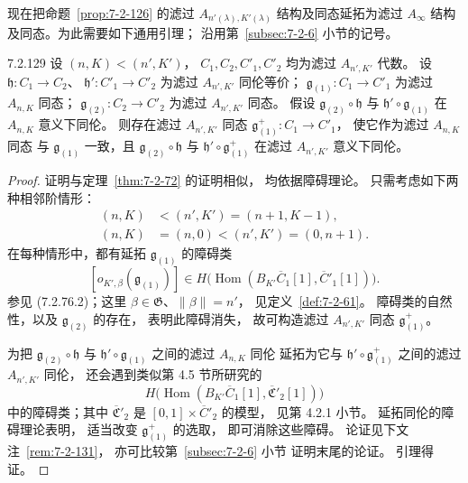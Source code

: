 现在把命题~\ref{prop:7-2-126}
的滤过 $A_{n'(\lambda),K'(\lambda)}$
结构及同态延拓为滤过 $A_\infty$
结构及同态。为此需要如下通用引理；
沿用第~\ref{subsec:7-2-6} 小节的记号。
%
\begin{lemma}{7.2.129}\label{lem:7-2-129}
设 $(n,K)<(n',K')$，
$C_1,C_2,C'_1,C'_2$
均为滤过 $A_{n',K'}$ 代数。
设
$\mathfrak h\colon C_1\to C_2$、
$\mathfrak h'\colon C'_1\to C'_2$
为滤过 $A_{n',K'}$ 同伦等价；
$\mathfrak g_{(1)}\colon C_1\to C'_1$
为滤过 $A_{n,K}$ 同态；
$\mathfrak g_{(2)}\colon C_2\to C'_2$
为滤过 $A_{n',K'}$ 同态。
假设 $\mathfrak g_{(2)}\circ\mathfrak h$
与 $\mathfrak h'\circ\mathfrak g_{(1)}$
在 $A_{n,K}$ 意义下同伦。
则存在滤过 $A_{n',K'}$ 同态
$\mathfrak g^+_{(1)}\colon C_1\to C'_1$，
使它作为滤过 $A_{n,K}$ 同态
与 $\mathfrak g_{(1)}$ 一致，且
$\mathfrak g_{(2)}\circ\mathfrak h$
与 $\mathfrak h'\circ\mathfrak g^+_{(1)}$
在滤过 $A_{n',K'}$ 意义下同伦。
\end{lemma}
\begin{proof}
证明与定理~\ref{thm:7-2-72} 的证明相似，
均依据障碍理论。
只需考虑如下两种相邻阶情形：
\begin{align}
(n,K)&<(n',K')=(n+1,K-1),
\tag{7.2.130.1}\label{eq:7-2-130-1}\\
(n,K)&=(n,0)<(n',K')=(0,n+1).
\tag{7.2.130.2}\label{eq:7-2-130-2}
\end{align}
在每种情形中，都有延拓
$\mathfrak g_{(1)}$ 的障碍类
\[
[o_{K',\beta}(\mathfrak g_{(1)})]
\in H\bigl(\operatorname{Hom}
(B_{K'}\overline C_1[1],\overline C'_1[1])\bigr).
\]
参见 (7.2.76.2)；这里
$\beta\in\mathfrak G$、$\|\beta\|=n'$，
见定义~\ref{def:7-2-61}。
障碍类的自然性，以及
$\mathfrak g_{(2)}$ 的存在，
表明此障碍消失，
故可构造滤过 $A_{n',K'}$ 同态
$\mathfrak g^+_{(1)}$。

为把
$\mathfrak g_{(2)}\circ\mathfrak h$
与 $\mathfrak h'\circ\mathfrak g_{(1)}$
之间的滤过 $A_{n,K}$ 同伦
延拓为它与
$\mathfrak h'\circ\mathfrak g^+_{(1)}$
之间的滤过 $A_{n',K'}$ 同伦，
还会遇到类似第 4.5 节所研究的
\[
H\bigl(\operatorname{Hom}
(B_{K'}\overline C_1[1],\overline{\mathfrak C}'_2[1])\bigr)
\]
中的障碍类；其中
$\overline{\mathfrak C}'_2$ 是
$[0,1]\times\overline C'_2$ 的模型，
见第 4.2.1 小节。
延拓同伦的障碍理论表明，
适当改变 $\mathfrak g^+_{(1)}$ 的选取，
即可消除这些障碍。
论证见下文注~\ref{rem:7-2-131}，
亦可比较第~\ref{subsec:7-2-6} 小节
证明末尾的论证。
引理得证。
\end{proof}

